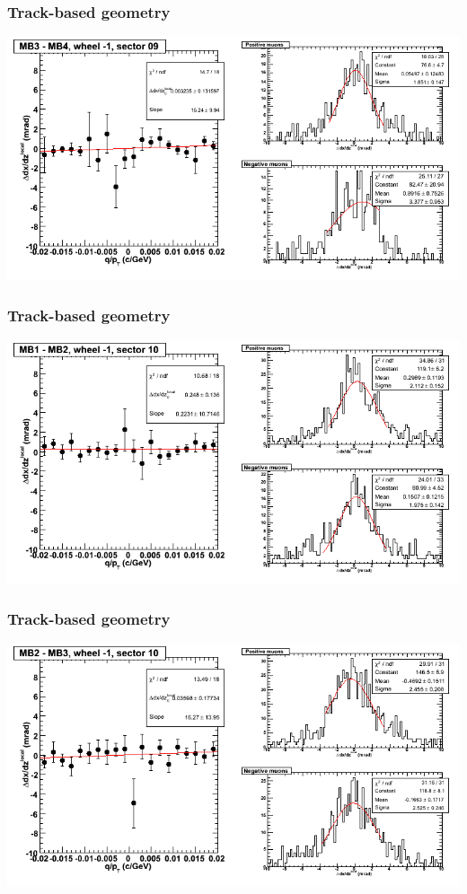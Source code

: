 \documentclass[compress]{beamer}
\begin{document}
\begin{frame}
\frametitle{Track-based geometry}
\includegraphics[width=\linewidth]{NOV4_segdiffs/dt13_slope_B_09_34.png}
\end{frame}

\begin{frame}
\frametitle{Track-based geometry}
\includegraphics[width=\linewidth]{NOV4_segdiffs/dt13_slope_B_10_12.png}
\end{frame}

\begin{frame}
\frametitle{Track-based geometry}
\includegraphics[width=\linewidth]{NOV4_segdiffs/dt13_slope_B_10_23.png}
\end{frame}
\end{document}
